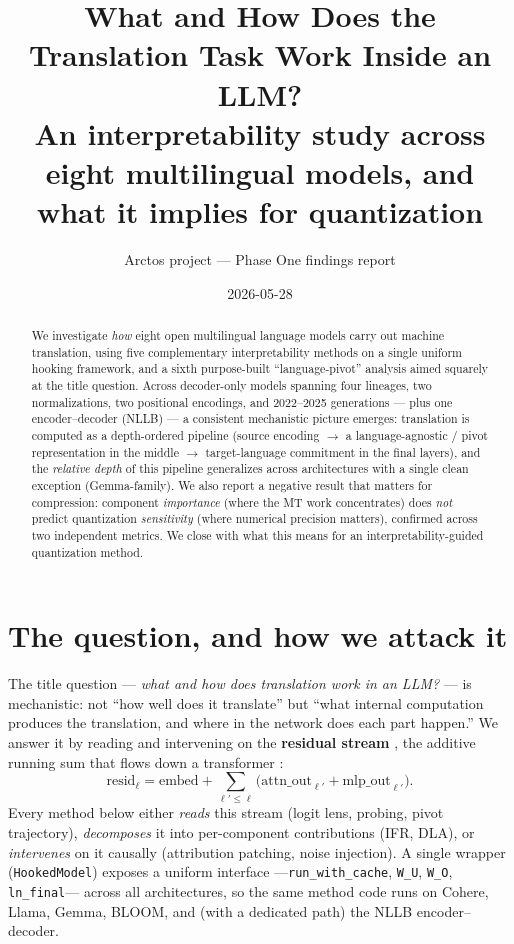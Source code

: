 \documentclass[11pt]{article}
\title{\textbf{What and How Does the Translation Task Work Inside an LLM?}\\[2pt]
\large An interpretability study across eight multilingual models, and what it
implies for quantization}
\author{Arctos project --- Phase One findings report}
\date{2026-05-28}
\newcommand{\code}[1]{\texttt{\small #1}}
\begin{document}
\maketitle

\begin{abstract}
\noindent
We investigate \emph{how} eight open multilingual language models carry out
machine translation, using five complementary interpretability methods on a
single uniform hooking framework, and a sixth purpose-built ``language-pivot''
analysis aimed squarely at the title question. Across decoder-only models
spanning four lineages, two normalizations, two positional encodings, and
2022--2025 generations --- plus one encoder--decoder (NLLB) --- a consistent
mechanistic picture emerges: translation is computed as a depth-ordered
pipeline (source encoding $\rightarrow$ a language-agnostic / pivot
representation in the middle $\rightarrow$ target-language commitment in the
final layers), and the \emph{relative depth} of this pipeline generalizes
across architectures with a single clean exception (Gemma-family). We also
report a negative result that matters for compression: component
\emph{importance} (where the MT work concentrates) does \emph{not} predict
quantization \emph{sensitivity} (where numerical precision matters),
confirmed across two independent metrics. We close with what this means for an
interpretability-guided quantization method.
\end{abstract}

\section{The question, and how we attack it}

The title question --- \emph{what and how does translation work in an LLM?}
--- is mechanistic: not ``how well does it translate'' but ``what internal
computation produces the translation, and where in the network does each part
happen.'' We answer it by reading and intervening on the \textbf{residual
stream} \citep{elhage2021framework}, the additive running sum that flows down a
transformer \citep{vaswani2017attention}:
\[
\text{resid}_\ell = \text{embed} + \sum_{\ell' \le \ell}\bigl(\text{attn\_out}_{\ell'} + \text{mlp\_out}_{\ell'}\bigr).
\]
Every method below either \emph{reads} this stream (logit lens, probing,
pivot trajectory), \emph{decomposes} it into per-component contributions
(IFR, DLA), or \emph{intervenes} on it causally (attribution patching, noise
injection). A single wrapper (\code{HookedModel}) exposes a uniform interface
---\code{run\_with\_cache}, \code{W\_U}, \code{W\_O}, \code{ln\_final}---
across all architectures, so the same method code runs on Cohere, Llama,
Gemma, BLOOM, and (with a dedicated path) the NLLB encoder--decoder.
\end{document}
